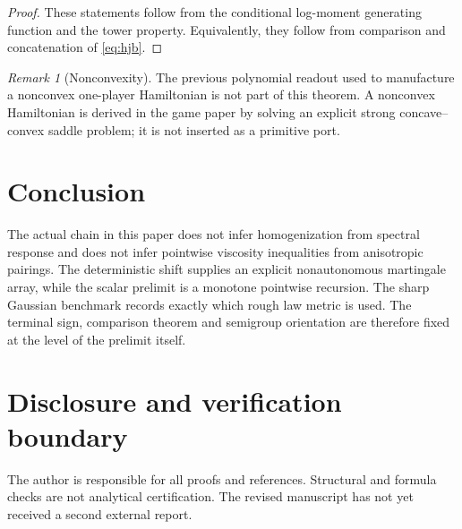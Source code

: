 \documentclass[11pt,reqno]{amsart}
\theoremstyle{definition}
\theoremstyle{remark}
\newtheorem{remark}[theorem]{Remark}
\begin{document}
\begin{proof}
These statements follow from the conditional log-moment generating function
and the tower property.  Equivalently, they follow from comparison and
concatenation of \eqref{eq:hjb}.
\end{proof}

\begin{remark}[Nonconvexity]
The previous polynomial readout used to manufacture a nonconvex one-player
Hamiltonian is not part of this theorem.  A nonconvex Hamiltonian is derived in
the game paper by solving an explicit strong concave--convex saddle problem;
it is not inserted as a primitive port.
\end{remark}

\section{Conclusion}

The actual chain in this paper does not infer homogenization from spectral
response and does not infer pointwise viscosity inequalities from anisotropic
pairings.  The deterministic shift supplies an explicit nonautonomous
martingale array, while the scalar prelimit is a monotone pointwise recursion.
The sharp Gaussian benchmark records exactly which rough law metric is used.
The terminal sign, comparison theorem and semigroup orientation are therefore
fixed at the level of the prelimit itself.

\section*{Disclosure and verification boundary}
The author is responsible for all proofs and references.  Structural and
formula checks are not analytical certification.  The revised manuscript has
not yet received a second external report.



\end{document}

